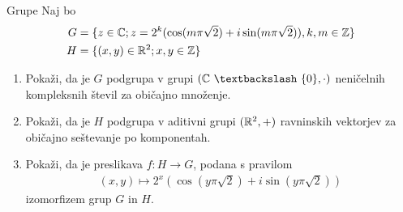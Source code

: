 \begin{frame}{Grupe}
	Naj bo
	\begin{align*}
		G &= \{ z \in \mathbb{C}; z=2^k(\cos (m \pi \sqrt{2})+ i\sin (m \pi \sqrt{2})), k, m \in \mathbb{Z} \} \\
		H &= \{ (x, y) \in \mathbb{R}^2; x, y \in \mathbb{Z} \}
	\end{align*}
	\begin{enumerate}
		\item
			Pokaži, da je $G$ podgrupa v grupi $(\CC~\textbackslash~\{ 0 \}, \cdot)$
			neničelnih kompleksnih števil za običajno množenje.
		\item
			Pokaži, da je $H$ podgrupa v aditivni grupi $(\mathbb{R}^2, +)$
			ravninskih vektorjev za običajno seštevanje po komponentah.
		\item
			Pokaži, da je preslikava $f:H\to G$, podana s pravilom
			\begin{align*}
			(x, y) \mapsto 2^x(\cos (y \pi \sqrt{2})+i\sin (y \pi \sqrt{2}))
			\end{align*}
			izomorfizem grup $G$ in $H$.
	\end{enumerate}
\end{frame}
